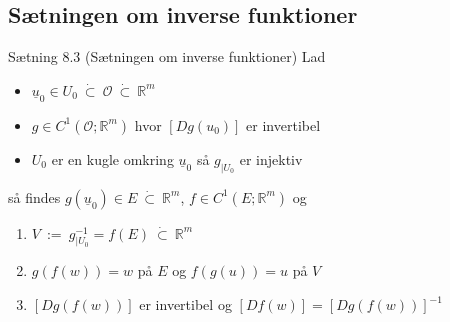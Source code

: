 \subsection{Sætningen om inverse funktioner}
\begin{boks}{Sætning 8.3 (Sætningen om inverse funktioner)}
  Lad
  \begin{itemize}[label = $\ast$]
    \item $\underline{u}_0 \in U_0 \ \dot{\subset} \ \mathcal{O} \ \dot{\subset} \ \mathbb{R}^m$
    \item $g \in C^1(\mathcal{O}; \mathbb{R}^m)$ hvor $[Dg(u_0)]$ er invertibel
    \item $U_0$ er en kugle omkring $\underline{u}_0$ så $g_{|U_0}$ er injektiv
  \end{itemize}
  så findes $g(\underline{u}_0) \in E \ \dot{\subset} \ \mathbb{R}^m$, $f \in C^1(E; \mathbb{R}^m)$ og
  \begin{enumerate}[label = (\arabic*)]
    \item $V \ := \ g^{-1}_{|U_0} = f(E) \ \dot{\subset} \ \mathbb{R}^m$
    \item $g(f(w)) = w$ på $E$ og $f(g(u)) = u$ på $V$
    \item $[Dg(f(w))]$ er invertibel og $[Df(w)] = [Dg(f(w))]^{-1}$
  \end{enumerate}
\end{boks}
